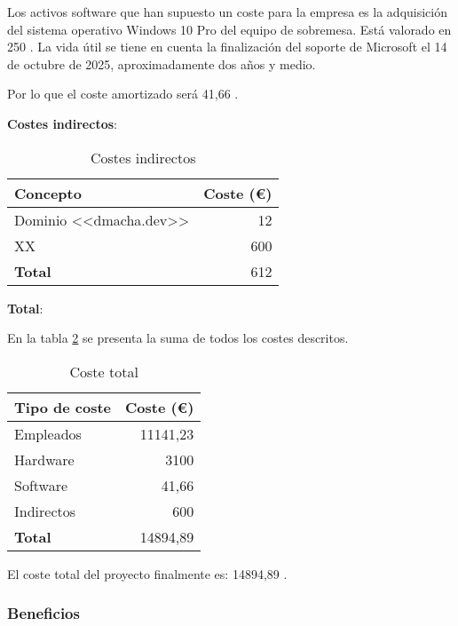 Los activos software que han supuesto un coste para la empresa es la adquisición
del sistema operativo Windows 10 Pro del equipo de sobremesa. Está valorado en
250 \texteuro. La vida útil se tiene en cuenta la finalización del soporte de
Microsoft el 14 de octubre de 2025, aproximadamente dos años y medio.

Por lo que el coste amortizado será 41,66 \texteuro.

\clearpage
\textbf{Costes indirectos}:

\begin{table}[H]
    \centering
\begin{tabular}{lr}
\toprule
\textbf{Concepto}      & \textbf{Coste (€)}     \\ \midrule
Dominio <<dmacha.dev>>     & 12                    \\
XX                   & 600                     \\ \midrule
\textbf{Total}       & 612                     \\ \midrule
\end{tabular}
\caption{Costes indirectos}
\label{tabla:indirectos}
\end{table}


\textbf{Total}:

En la tabla \ref{tabla:total} se presenta la suma de todos los costes descritos.

\begin{table}[H]
    \centering
\begin{tabular}{lr}
\toprule
\textbf{Tipo de coste}     & \textbf{Coste (€)}     \\ \midrule
Empleados                  & 11141,23                    \\
Hardware                   & 3100                     \\
Software                   & 41,66                     \\
Indirectos                 & 600                     \\
\textbf{Total}             & 14894,89                     \\ \midrule
\end{tabular}
\caption{Coste total}
\label{tabla:total}
\end{table}

El coste total del proyecto finalmente es: 14894,89 \texteuro.

\subsubsection{Beneficios}

